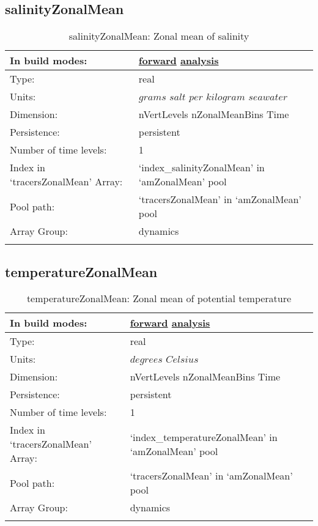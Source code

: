\subsection[salinityZonalMean]{salinityZonalMean}
\label{subsec:var_sec_amZonalMean_salinityZonalMean}
\begin{center}
\begin{longtable}{| p{2.0in} | p{4.0in} |}
        \hline 
        In build modes: & \hyperref[subsec:forward_var_tab_amZonalMean]{forward} \hyperref[subsec:analysis_var_tab_amZonalMean]{analysis} \\
        \hline 
        Type: & real \\
        \hline 
        Units: & $grams$ $salt$ $per$ $kilogram$ $seawater$ \\
        \hline 
        Dimension: & nVertLevels nZonalMeanBins Time \\
        \hline 
        Persistence: & persistent \\
        \hline 
        Number of time levels: & 1 \\
        \hline 
		 Index in `tracersZonalMean' Array: & `index\_salinityZonalMean' in `amZonalMean' pool \\
		 \hline 
            Pool path: & `tracersZonalMean' in `amZonalMean' pool \\
		 \hline 
		 Array Group: & dynamics \\
		 \hline 
    \caption{salinityZonalMean: Zonal mean of salinity}
\end{longtable}
\end{center}
\subsection[temperatureZonalMean]{temperatureZonalMean}
\label{subsec:var_sec_amZonalMean_temperatureZonalMean}
\begin{center}
\begin{longtable}{| p{2.0in} | p{4.0in} |}
        \hline 
        In build modes: & \hyperref[subsec:forward_var_tab_amZonalMean]{forward} \hyperref[subsec:analysis_var_tab_amZonalMean]{analysis} \\
        \hline 
        Type: & real \\
        \hline 
        Units: & $degrees$ $Celsius$ \\
        \hline 
        Dimension: & nVertLevels nZonalMeanBins Time \\
        \hline 
        Persistence: & persistent \\
        \hline 
        Number of time levels: & 1 \\
        \hline 
		 Index in `tracersZonalMean' Array: & `index\_temperatureZonalMean' in `amZonalMean' pool \\
		 \hline 
            Pool path: & `tracersZonalMean' in `amZonalMean' pool \\
		 \hline 
		 Array Group: & dynamics \\
		 \hline 
    \caption{temperatureZonalMean: Zonal mean of potential temperature}
\end{longtable}
\end{center}
